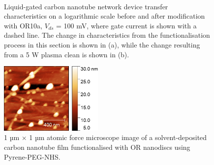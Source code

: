 \documentclass[
  a4paper,
]{scrbook}
\begin{document}
\begin{figure}
\begin{minipage}[t]{0.45\linewidth}
{{}

}

\end{minipage}%
%
\begin{minipage}[t]{0.01\linewidth}

{\centering 

~

}

\end{minipage}%

\caption[Liquid-gated carbon nanotube network device transfer
characteristics on a logarithmic scale before and after modification
with OR10a, compared to liquid-gated characteristics before and after a
5 W plasma clean.]{\label{fig-OR10a-TX-comparison}Liquid-gated carbon
nanotube network device transfer characteristics on a logarithmic scale
before and after modification with OR10a, \(V_{ds}\) = 100 mV, where
gate current is shown with a dashed line. The change in characteristics
from the functionalisation process in this section is shown in (a),
while the change resulting from a 5 W plasma clean is shown in (b).}

\end{figure}

\begin{figure}

{\centering \includegraphics[width=0.45\textwidth,height=\textheight]{figures/ch7/Ned_funcverification_PPNHSwamine_R_1um_20220414_00466.png}

}

\caption[1 µm \(\times\) 1 µm atomic force microscope image of a
solvent-deposited carbon nanotube film functionalised with OR nanodiscs
using Pyrene-PEG-NHS.]{\label{fig-PPN-linker}1 µm \(\times\) 1 µm atomic
force microscope image of a solvent-deposited carbon nanotube film
functionalised with OR nanodiscs using Pyrene-PEG-NHS.}

\end{figure}
\end{document}
